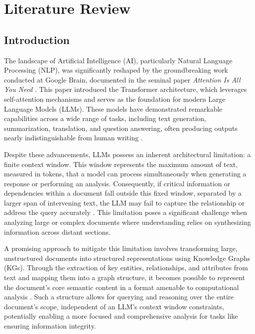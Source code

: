 \chapter{Literature Review}
\label{chap:litreview}

\section{Introduction}
The landscape of Artificial Intelligence (AI), particularly Natural Language Processing (NLP), was significantly reshaped by the groundbreaking work conducted at Google Brain, documented in the seminal paper \textit{Attention Is All You Need} \parencite{RefWorks:RefID:81-vaswani2017attention}. This paper introduced the Transformer architecture, which leverages self-attention mechanisms and serves as the foundation for modern Large Language Models (LLMs). These models have demonstrated remarkable capabilities across a wide range of tasks, including text generation, summarization, translation, and question answering, often producing outputs nearly indistinguishable from human writing \parencite{RefWorks:RefID:89-badshah2024quantifying,RefWorks:RefID:35-verma2024journey}.

Despite these advancements, LLMs possess an inherent architectural limitation: a finite context window. This window represents the maximum amount of text, measured in tokens, that a model can process simultaneously when generating a response or performing an analysis. Consequently, if critical information or dependencies within a document fall outside this fixed window, separated by a larger span of intervening text, the LLM may fail to capture the relationship or address the query accurately \parencite{RefWorks:RefID:100-kaplan2020scaling}. This limitation poses a significant challenge when analyzing large or complex documents where understanding relies on synthesizing information across distant sections.

A promising approach to mitigate this limitation involves transforming large, unstructured documents into structured representations using Knowledge Graphs (KGs). Through the extraction of key entities, relationships, and attributes from text and mapping them into a graph structure, it becomes possible to represent the document's core semantic content in a format amenable to computational analysis \parencite{RefWorks:RefID:102-hogan2021knowledge}. Such a structure allows for querying and reasoning over the entire document's scope, independent of an LLM's context window constraints, potentially enabling a more focused and comprehensive analysis for tasks like ensuring information integrity.

